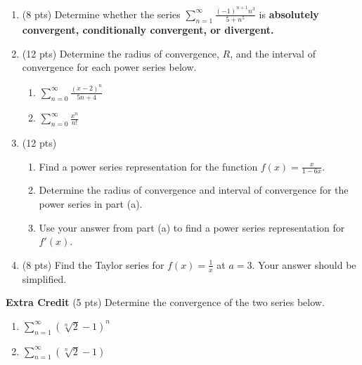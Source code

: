 \documentclass[12pt]{article}
\let\ds\displaystyle
\begin{document}
\begin{enumerate}
\begin{enumerate}
	\vfill

	\item $\ds \sum_{n=1}^{\infty} (-1)^{n+1}\ln\left(\tfrac{1}{n}\right)$ 

	\vfill

	
\newpage	
	\item $\ds \sum_{n=1}^{\infty} (-1)^{n+1} \frac{1}{\sqrt[3]{n+2}}$ 

	\vfill
	\end{enumerate}

\item (8 pts) Determine whether the series $\ds \sum_{n=1}^{\infty}  \frac{(-1)^{n+1}n^3}{5+n^5}$ is \textbf{absolutely convergent, conditionally convergent, or divergent.}
\vfill

\vfill




\newpage
\item (12 pts) Determine the radius of convergence, $R$, and the interval of convergence for each power series below.
	\begin{enumerate}
	\item  $\ds \sum_{n=0}^\infty \frac{(x-2)^n}{5n+4}$
	\vfill
	\vfill
	\item  $\ds \sum_{n=0}^\infty \frac{x^n}{n!}$
	\vfill
	\end{enumerate}
\newpage
\item (12 pts)
	\begin{enumerate}
	\item Find a power series representation for the function $\ds f(x)=\frac{x}{1-6x}.$
	\vfill
	\item Determine the radius of convergence and interval of convergence for the power series in part (a).
	\vfill
	\item Use your answer from part (a) to find a power series representation for $f'(x).$ 
	\vfill
	\end{enumerate}
\newpage
\item (8 pts) Find the Taylor series for $f(x)=\frac{1}{x}$ at $a=3.$ Your answer should be simplified.
	\vfill
	\vfill

\end{enumerate}

\textbf{Extra Credit} (5 pts) Determine the convergence of the two series below.
	\begin{enumerate}
	\item[a.]  $\ds \sum_{n=1}^\infty (\sqrt[n]{2} -1)^n$
	\vfill
	\item[b.]  $\ds \sum_{n=1}^\infty (\sqrt[n]{2} -1)$
	\vfill
	\end{enumerate}
\end{document}
